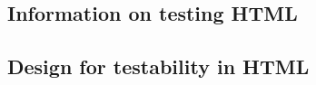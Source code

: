 

\subsection{Information on testing HTML \gdauts{}}


\subsection{Design for testability in HTML \gdauts{}}

